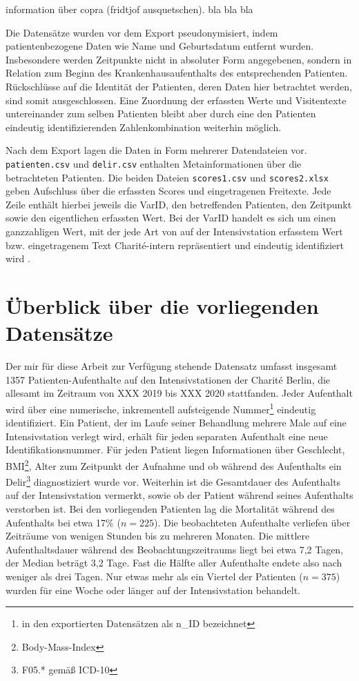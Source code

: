 information über copra (fridtjof ausquetschen). bla bla bla

Die Datensätze wurden vor dem Export pseudonymisiert, indem patientenbezogene Daten wie Name und Geburtsdatum entfernt wurden. Insbesondere werden Zeitpunkte nicht in absoluter Form angegebenen, sondern in Relation zum Beginn des Krankenhausaufenthalts des entsprechenden Patienten. Rückschlüsse auf die Identität der Patienten, deren Daten hier betrachtet werden, sind somit ausgeschlossen. Eine Zuordnung der erfassten Werte und Visitentexte untereinander zum selben Patienten bleibt aber durch eine den Patienten eindeutig identifizierenden Zahlenkombination weiterhin möglich.

Nach dem Export lagen die Daten in Form mehrerer Datendateien vor. \texttt{patienten.csv} und \texttt{delir.csv} enthalten Metainformationen über die betrachteten Patienten. Die beiden Dateien \texttt{scores1.csv} und \texttt{scores2.xlsx} geben Aufschluss über die erfassten Scores und eingetragenen Freitexte. Jede Zeile enthält hierbei jeweils die VarID, den betreffenden Patienten, den Zeitpunkt sowie den eigentlichen erfassten Wert. Bei der VarID handelt es sich um einen ganzzahligen Wert, mit der jede Art von auf der Intensivstation erfasstem Wert bzw. eingetragenem Text Charité-intern repräsentiert und eindeutig identifiziert wird .

\section{Überblick über die vorliegenden Datensätze} \label{section:vorliegende_daten}
Der mir für diese Arbeit zur Verfügung stehende Datensatz umfasst insgesamt 1357 Patienten-Aufenthalte auf den Intensivstationen der Charité Berlin, die allesamt im Zeitraum von XXX 2019 bis XXX 2020 stattfanden. Jeder Aufenthalt wird über eine numerische, inkrementell aufsteigende Nummer\footnote{in den exportierten Datensätzen als n\_ID bezeichnet} eindeutig identifiziert. Ein Patient, der im Laufe seiner Behandlung mehrere Male auf eine Intensivstation verlegt wird, erhält für jeden separaten Aufenthalt eine neue Identifikationsnummer. Für jeden Patient liegen Informationen über Geschlecht, BMI\footnote{Body-Mass-Index}, Alter zum Zeitpunkt der Aufnahme und ob während des Aufenthalts ein Delir\footnote{F05.* gemäß ICD-10} diagnostiziert wurde vor. Weiterhin ist die Gesamtdauer des Aufenthalts auf der Intensivstation vermerkt, sowie ob der Patient während seines Aufenthalts verstorben ist. Bei den vorliegenden Patienten lag die Mortalität während des Aufenthalts bei etwa 17\% ($n=225$). Die beobachteten Aufenthalte verliefen über Zeiträume von wenigen Stunden bis zu mehreren Monaten. Die mittlere Aufenthaltsdauer während des Beobachtungszeitraums liegt bei etwa 7,2 Tagen, der Median beträgt 3,2 Tage. Fast die Hälfte aller Aufenthalte endete also nach weniger als drei Tagen. Nur etwas mehr als ein Viertel der Patienten ($n=375$) wurden für eine Woche oder länger auf der Intensivstation behandelt.

